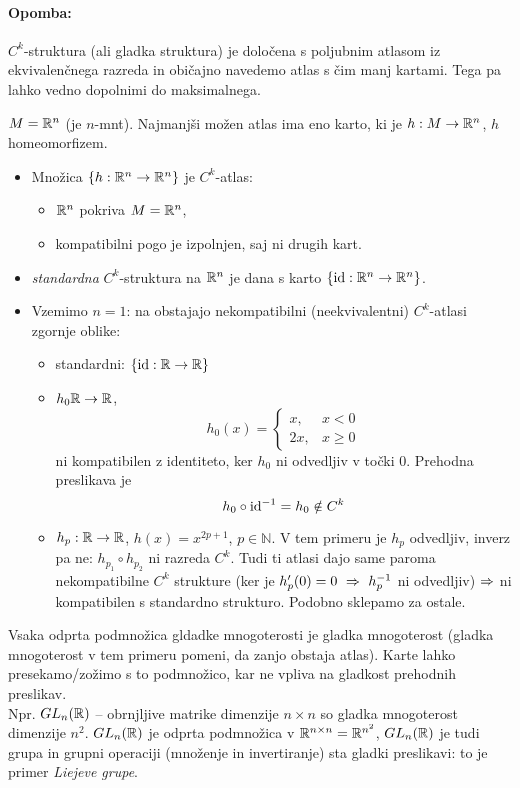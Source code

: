 \paragraph{Opomba:} $C^k$-struktura (ali gladka struktura) je dolo\v cena s poljubnim atlasom iz ekvivalen\v cnega razreda in obi\v cajno navedemo
atlas s \v cim manj kartami. Tega pa lahko vedno dopolnimi do maksimalnega.

\begin{zgled}
	$M = \mathbb{R}^n$ (je $n$-mnt). Najmanj\v si mo\v zen atlas ima eno karto, ki je $h : M \to \mathbb{R}^n$, $h$ homeomorfizem.
	\begin{itemize}
		\item{Mno\v zica $\{h : \mathbb{R}^n \to \mathbb{R}^n\}$ je $C^k$-atlas:
			\begin{itemize}
				\item{$\mathbb{R}^n$ pokriva $M = \mathbb{R}^n$,}
				\item{kompatibilni pogo je izpolnjen, saj ni drugih kart.}
			\end{itemize}}
		\item{{\em standardna} $C^k$-struktura na $\mathbb{R}^n$ je dana s karto $\{\operatorname{id} : \mathbb{R}^n \to \mathbb{R}^n\}$.}
		\item{Vzemimo $n = 1$: na \R obstajajo nekompatibilni (neekvivalentni) $C^k$-atlasi zgornje oblike:
			\begin{itemize}
				\item{standardni: $\{\operatorname{id} : \mathbb{R} \to \mathbb{R}\}$}
				\item{$h_0 \mathbb{R} \to \mathbb{R}$,
					\[
						h_0 (x) =
						\left\{\begin{array}{rl}
							x,  & x < 0 \\
							2x, & x \geq 0
						\end{array}\right.
					\]
					ni kompatibilen z identiteto, ker $h_0$ ni odvedljiv v to\v cki $0$. Prehodna preslikava je
					\[
						h_0 \circ \operatorname{id}^{-1} = h_0 \notin C^k
					\]}
				\item{$h_p : \mathbb{R} \to \mathbb{R}$, $h(x) = x^{2p + 1}$, $p \in \mathbb{N}$. V tem primeru je $h_p$ odvedljiv, inverz pa ne:
					$h_{p_1} \circ h_{p_2}$ ni razreda $C^k$. Tudi ti atlasi dajo same paroma nekompatibilne $C^k$ strukture (ker
					je $h_p'(0) = 0\ \then\ h^{-1}_p$ ni odvedljiv) $\Rightarrow$ ni kompatibilen s standardno strukturo. Podobno sklepamo
					za ostale.}
			\end{itemize}}
	\end{itemize}
\end{zgled}
\begin{zgled}
	Vsaka odprta podmno\v zica gldadke mnogoterosti je gladka mnogoterost (gladka mnogoterost v tem primeru pomeni, da zanjo obstaja atlas).
	Karte lahko presekamo/zo\v zimo s to podmno\v zico, kar ne vpliva na gladkost prehodnih preslikav.\\[6pt]
	
	Npr. $GL_n(\mathbb{R})$ -- obrnjljive matrike
	dimenzije $n \times n$ so gladka mnogoterost dimenzije $n^2$. $GL_n(\mathbb{R})$ je odprta podmno\v zica v $\mathbb{R}^{n \times n} = \mathbb{R}^{n^2}$, $GL_n(\mathbb{R})$ je
	tudi grupa in grupni operaciji (mno\v zenje in invertiranje) sta gladki preslikavi: to je primer \emph{Liejeve grupe}.
\end{zgled}
